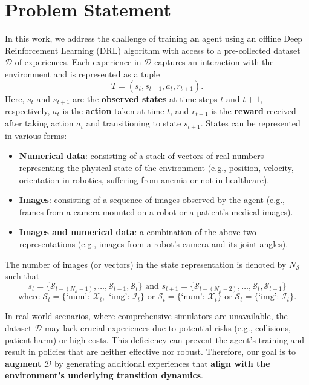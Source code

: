 \section{Problem Statement}

In this work, we address the challenge of training an agent using
an offline Deep Reinforcement Learning (DRL) algorithm with access 
to a pre-collected dataset \( \mathcal{D} \) of experiences. 
Each experience in \( \mathcal{D} \) captures an interaction with
the environment and is represented as a tuple
\[ T = (s_t, s_{t+1}, a_t, r_{t+1}) .\] Here, \( s_t \)
and \( s_{t+1} \) are the \textbf{observed states} at time-steps
\( t \) and \( t+1 \), respectively, \( a_t \) is the \textbf{action}
taken at time \( t \), and \( r_{t+1} \) is the \textbf{reward} received
after taking action \( a_t \) and transitioning to state \( s_{t+1} \).
States can be represented in various forms:
\begin{itemize}
    \item \textbf{Numerical data}: consisting of a stack of vectors of
    real numbers representing the physical state of the environment
    (e.g., position, velocity, orientation in robotics,
    suffering from anemia or not in healthcare).
    \item \textbf{Images}: consisting of a sequence of images
    observed by the agent (e.g., frames from a camera mounted on a
    robot or a patient's medical images).
    \item \textbf{Images and numerical data}: a combination of the
    above two representations (e.g., images from a robot's camera
    and its joint angles).
\end{itemize}
The number of images (or vectors) in the state representation
is denoted by \( N_{\mathcal{S}} \) such that
\[ s_t = \{ \mathcal{S}_{t-(N_{\mathcal{S}}-1)}, \ldots,
\mathcal{S}_{t-1}, \mathcal{S}_t \} \text{  and  }
s_{t+1} = \{ \mathcal{S}_{t-(N_{\mathcal{S}}-2)}, \ldots,
\mathcal{S}_t, \mathcal{S}_{t+1} \} \]
\[
    \text{where } \mathcal{S}_t =
    \{\text{`num': } \mathcal{X}_t, \text{ `img': } \mathcal{I}_t\} \text{ or }
    \mathcal{S}_t = \{\text{`num': } \mathcal{X}_t\}
    \text{ or } \mathcal{S}_t = \{\text{`img': } \mathcal{I}_t\}.
\]

In real-world scenarios, where comprehensive simulators are unavailable,
the dataset \( \mathcal{D} \) may lack crucial experiences due
to potential risks (e.g., collisions, patient harm) or high costs.
This deficiency can prevent the agent's training and result in policies
that are neither effective nor robust. Therefore, our goal is to \textbf{augment}
\( \mathcal{D} \) by generating additional experiences that
\textbf{align with the environment's underlying transition dynamics}.

